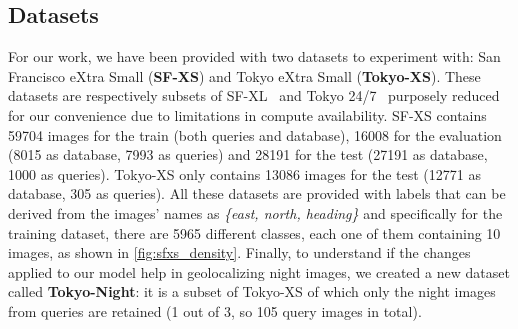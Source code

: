 \documentclass[10pt,twocolumn,letterpaper]{article}
\begin{document}
\subsection{Datasets}
For our work, we have been provided with two datasets to experiment with: San Francisco eXtra Small (\textbf{SF-XS}) and Tokyo eXtra Small (\textbf{Tokyo-XS}). These datasets are respectively subsets of SF-XL~\cite{Berton_CVPR_2022_CosPlace} and Tokyo 24/7~\cite{tokyo247} purposely reduced for our convenience due to limitations in compute availability. SF-XS contains 59704 images for the train (both queries and database), 16008 for the evaluation (8015 as database, 7993 as queries) and 28191 for the test (27191 as database, 1000 as queries).
Tokyo-XS only contains 13086 images for the test (12771 as database, 305 as queries).
All these datasets are provided with labels that can be derived from the images' names as \textit{\{east, north, heading\}} and specifically for the training dataset, there are 5965 different classes, each one of them containing 10 images, as shown in \cref{fig:sfxs_density}.
Finally, to understand if the changes applied to our model help in geolocalizing night images, we created a new dataset called \textbf{Tokyo-Night}: it is a subset of Tokyo-XS of which only the night images from queries are retained (1 out of 3, so 105 query images in total).
\end{document}
